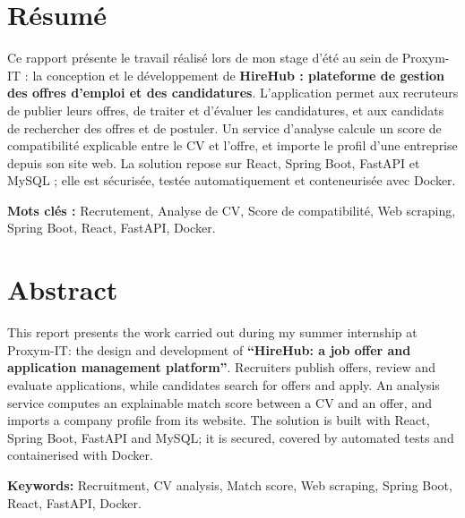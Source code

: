 \documentclass[12pt,a4paper]{report}
\begin{document}
\clearpage
\thispagestyle{empty}
\section*{Résumé}
Ce rapport présente le travail réalisé lors de mon stage d'été au sein de Proxym-IT : la conception et le développement de \textbf{\og HireHub : plateforme de gestion des offres d'emploi et des candidatures\fg{}}. L'application permet aux recruteurs de publier leurs offres, de traiter et d'évaluer les candidatures, et aux candidats de rechercher des offres et de postuler. Un service d'analyse calcule un score de compatibilité explicable entre le CV et l'offre, et importe le profil d'une entreprise depuis son site web. La solution repose sur React, Spring Boot, FastAPI et MySQL ; elle est sécurisée, testée automatiquement et conteneurisée avec Docker.

\noindent\textbf{Mots clés :} Recrutement, Analyse de CV, Score de compatibilité, Web scraping, Spring Boot, React, FastAPI, Docker.

\vspace{1.5cm}
\section*{Abstract}
This report presents the work carried out during my summer internship at Proxym-IT: the design and development of \textbf{“HireHub: a job offer and application management platform”}. Recruiters publish offers, review and evaluate applications, while candidates search for offers and apply. An analysis service computes an explainable match score between a CV and an offer, and imports a company profile from its website. The solution is built with React, Spring Boot, FastAPI and MySQL; it is secured, covered by automated tests and containerised with Docker.

\noindent\textbf{Keywords:} Recruitment, CV analysis, Match score, Web scraping, Spring Boot, React, FastAPI, Docker.
\end{document}

